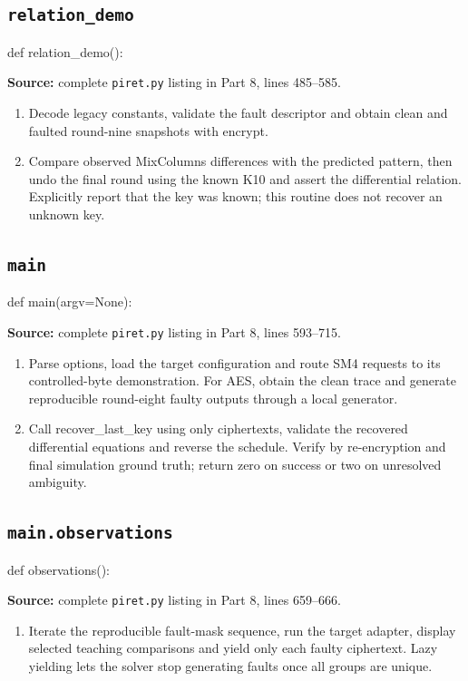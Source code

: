 \subsection{\texttt{relation\_\allowbreak{}demo}}
\begin{lightcode}
def relation_demo():
\end{lightcode}
\noindent\textbf{Source:} complete \texttt{piret.py} listing in Part 8, lines 485--585.
\begin{enumerate}
\item Decode legacy constants, validate the fault descriptor and obtain clean and faulted round-nine snapshots with encrypt.
\item Compare observed MixColumns differences with the predicted pattern, then undo the final round using the known K10 and assert the differential relation. Explicitly report that the key was known; this routine does not recover an unknown key.
\end{enumerate}
\subsection{\texttt{main}}
\begin{lightcode}
def main(argv=None):
\end{lightcode}
\noindent\textbf{Source:} complete \texttt{piret.py} listing in Part 8, lines 593--715.
\begin{enumerate}
\item Parse options, load the target configuration and route SM4 requests to its controlled-byte demonstration. For AES, obtain the clean trace and generate reproducible round-eight faulty outputs through a local generator.
\item Call recover\_last\_key using only ciphertexts, validate the recovered differential equations and reverse the schedule. Verify by re-encryption and final simulation ground truth; return zero on success or two on unresolved ambiguity.
\end{enumerate}
\subsection{\texttt{main.observations}}
\begin{lightcode}
def observations():
\end{lightcode}
\noindent\textbf{Source:} complete \texttt{piret.py} listing in Part 8, lines 659--666.
\begin{enumerate}
\item Iterate the reproducible fault-mask sequence, run the target adapter, display selected teaching comparisons and yield only each faulty ciphertext. Lazy yielding lets the solver stop generating faults once all groups are unique.
\end{enumerate}
